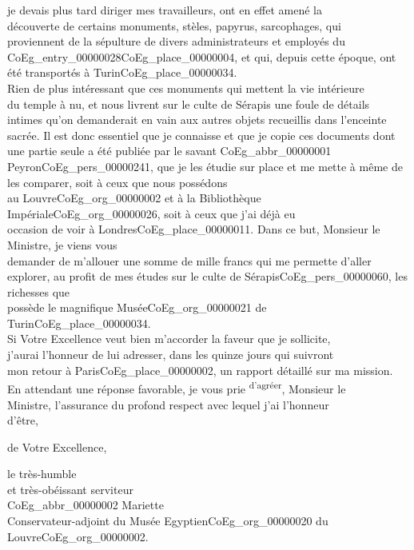 \documentclass{book}
\begin{document}
\noindent je devais plus tard diriger mes travailleurs, ont en effet amené la\\
découverte de certains monuments, stèles, papyrus, sarcophages, qui\\
proviennent de la sépulture de divers administrateurs et employés du\\
\Gls{CoEg_entry_00000028}\gls{CoEg_place_00000004}, et qui, depuis cette époque, ont été transportés à Turin\gls{CoEg_place_00000034}.\\
Rien de plus intéressant que ces monuments qui mettent la vie intérieure\\
du temple à nu, et nous livrent sur le culte de Sérapis une foule de détails\\
intimes qu’on demanderait en vain aux autres objets recueillis dans l’enceinte\\
sacrée. Il est donc essentiel que je connaisse et que je copie ces documents dont\\
une partie seule a été publiée par le savant \gls{CoEg_abbr_00000001} Peyron\gls{CoEg_pers_00000241}, que je les étudie sur
place et me mette à même de les comparer, soit à ceux que nous possédons\\
au Louvre\gls{CoEg_org_00000002} et à la Bibliothèque Impériale\gls{CoEg_org_00000026}, soit à ceux que j’ai déjà eu\\
occasion de voir à Londres\gls{CoEg_place_00000011}. Dans ce but, Monsieur le Ministre, je viens vous\\
demander de m’allouer une somme de mille francs qui me permette d’aller\\
explorer, au profit de mes études sur le culte de Sérapis\gls{CoEg_pers_00000060}, les richesses que\\
possède le magnifique Musée\gls{CoEg_org_00000021} de Turin\gls{CoEg_place_00000034}.\\
\indent Si Votre Excellence veut bien m’accorder la faveur que je sollicite,\\
j’aurai l’honneur de lui adresser, dans les quinze jours qui suivront\\
mon retour à Paris\gls{CoEg_place_00000002}, un rapport détaillé sur ma mission.\\
\indent En attendant une réponse favorable, je vous prie \textsuperscript{d’agréer}, Monsieur le\\
Ministre, l’assurance du profond respect avec lequel j’ai l’honneur\\
d’être,
\begin{center}de Votre Excellence,\end{center}
\begin{center}\hspace{5cm}le très-humble\\
\hspace{5cm}et très-obéissant serviteur\\
\hspace{5cm}\gls{CoEg_abbr_00000002} Mariette\\
\hspace{5cm}Conservateur-adjoint du Musée Egyptien\gls{CoEg_org_00000020} du
\hspace{5cm}Louvre\gls{CoEg_org_00000002}.\end{center}
\end{document}
